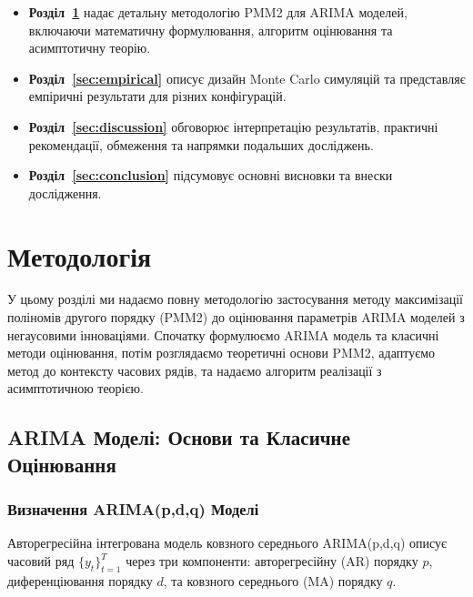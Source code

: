 \documentclass[12pt,a4paper]{article}
\begin{document}
	\begin{itemize}
		\item \textbf{Розділ~\ref{sec:methodology}} надає детальну методологію PMM2 для ARIMA моделей, включаючи математичну формулювання, алгоритм оцінювання та асимптотичну теорію.
		
		\item \textbf{Розділ~\ref{sec:empirical}} описує дизайн Monte Carlo симуляцій та представляє емпіричні результати для різних конфігурацій.
		
		\item \textbf{Розділ~\ref{sec:discussion}} обговорює інтерпретацію результатів, практичні рекомендації, обмеження та напрямки подальших досліджень.
		
		\item \textbf{Розділ~\ref{sec:conclusion}} підсумовує основні висновки та внески дослідження.
	\end{itemize}
	
	\section{Методологія}
	\label{sec:methodology}
	
	У цьому розділі ми надаємо повну методологію застосування методу максимізації поліномів другого порядку (PMM2) до оцінювання параметрів ARIMA моделей з негаусовими інноваціями. Спочатку формулюємо ARIMA модель та класичні методи оцінювання, потім розглядаємо теоретичні основи PMM2, адаптуємо метод до контексту часових рядів, та надаємо алгоритм реалізації з асимптотичною теорією.
	
	\subsection{ARIMA Моделі: Основи та Класичне Оцінювання}
	\label{subsec:arima_basics}
	
	\subsubsection{Визначення ARIMA(p,d,q) Моделі}
	
	Авторегресійна інтегрована модель ковзного середнього ARIMA(p,d,q) описує часовий ряд $\{y_t\}_{t=1}^T$ через три компоненти: авторегресійну (AR) порядку $p$, диференціювання порядку $d$, та ковзного середнього (MA) порядку $q$.
	
\end{document}

